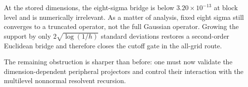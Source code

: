 \documentclass[11pt]{article}
\theoremstyle{definition}
\theoremstyle{remark}
\begin{document}
At the stored dimensions, the eight-sigma bridge is below
$3.20\times10^{-13}$ at block level and is numerically irrelevant.  As a
matter of analysis, fixed eight sigma still converges to a truncated operator,
not the full Gaussian operator.  Growing the support by only
$2\sqrt{\log(1/h)}$ standard deviations restores a second-order Euclidean
bridge and therefore closes the cutoff gate in the all-grid route.

The remaining obstruction is sharper than before: one must now validate the
dimension-dependent peripheral projectors and control their interaction with
the multilevel nonnormal resolvent recursion.



\end{document}
